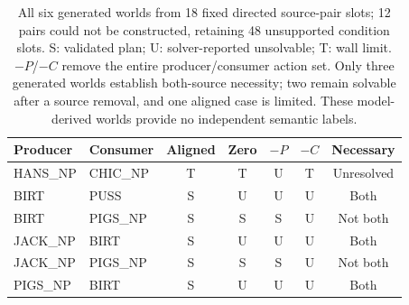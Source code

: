 \begin{table}[t]
\centering
\small
\begin{tabular}{llccccc}
\toprule
Producer & Consumer & Aligned & Zero & $-P$ & $-C$ & Necessary \\
\midrule
HANS\_NP & CHIC\_NP & T & T & U & T & Unresolved \\
BIRT & PUSS & S & U & U & U & Both \\
BIRT & PIGS\_NP & S & S & S & U & Not both \\
JACK\_NP & BIRT & S & U & U & U & Both \\
JACK\_NP & PIGS\_NP & S & S & S & U & Not both \\
PIGS\_NP & BIRT & S & U & U & U & Both \\
\bottomrule
\end{tabular}
\caption{All six generated worlds from 18 fixed directed source-pair slots; 12 pairs could not be constructed, retaining 48 unsupported condition slots. S: validated plan; U: solver-reported unsolvable; T: wall limit. $-P$/$-C$ remove the entire producer/consumer action set. Only three generated worlds establish both-source necessity; two remain solvable after a source removal, and one aligned case is limited. These model-derived worlds provide no independent semantic labels.}
\label{tab:composition-probes-oct23}
\end{table}
